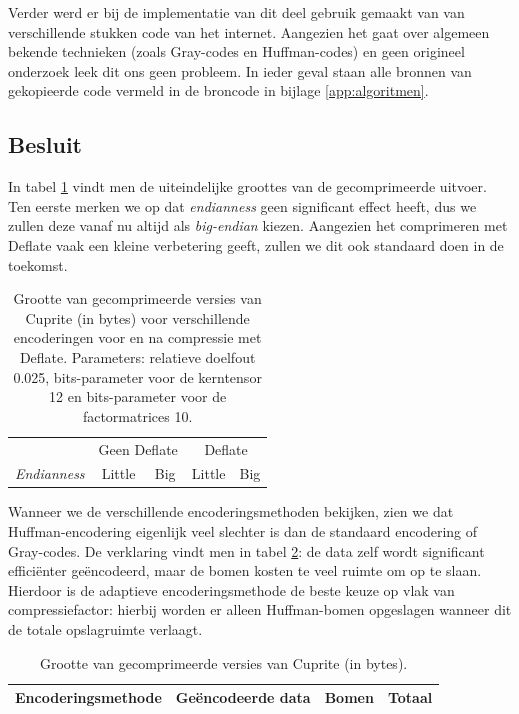 Verder werd er bij de implementatie van dit deel gebruik gemaakt van van verschillende stukken code van het internet. Aangezien het gaat over algemeen bekende technieken (zoals Gray-codes en Huffman-codes) en geen origineel onderzoek leek dit ons geen probleem. In ieder geval staan alle bronnen van gekopieerde code vermeld in de broncode in bijlage \ref{app:algoritmen}.

\subsection{Besluit}

In tabel \ref{table:encoding-comparison1} vindt men de uiteindelijke groottes van de gecomprimeerde uitvoer. Ten eerste merken we op dat \textit{endianness} geen significant effect heeft, dus we zullen deze vanaf nu altijd als \textit{big-endian} kiezen. Aangezien het comprimeren met Deflate vaak een kleine verbetering geeft, zullen we dit ook standaard doen in de toekomst.\\

\begin{table}[H]
\centering
\begin{tabular}{|l|c|c|c|c|}
\hline
& \multicolumn{2}{c|}{Geen Deflate} & \multicolumn{2}{c|}{Deflate} \\ \cline{1-5} 
\textit{Endianness} & Little & Big & Little & Big \\ \hline
                             
\end{tabular}
\caption{Grootte van gecomprimeerde versies van Cuprite (in bytes) voor verschillende encoderingen voor en na compressie met Deflate. Parameters: relatieve doelfout 0.025, bits-parameter voor de kerntensor 12 en bits-parameter voor de factormatrices 10.}
\label{table:encoding-comparison1}
\end{table}

Wanneer we de verschillende encoderingsmethoden bekijken, zien we dat Huffman-encodering eigenlijk veel slechter is dan de standaard encodering of Gray-codes. De verklaring vindt men in tabel \ref{table:encoding-comparison2}: de data zelf wordt significant effici\"enter ge\"encodeerd, maar de bomen kosten te veel ruimte om op te slaan. Hierdoor is de adaptieve encoderingsmethode de beste keuze op vlak van compressiefactor: hierbij worden er alleen Huffman-bomen opgeslagen wanneer dit de totale opslagruimte verlaagt.

\newpage
\begin{table}[H]
\centering
\begin{tabular}{|l|c|c|c|}
\hline
Encoderingsmethode & Ge\"encodeerde data & Bomen & Totaal \\ \hline
                             
\end{tabular}
\caption{Grootte van gecomprimeerde versies van Cuprite (in bytes).}
\label{table:encoding-comparison2}
\end{table}

